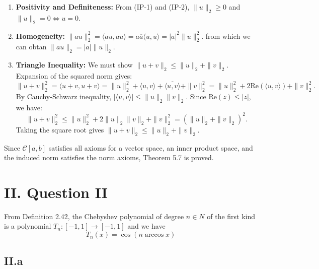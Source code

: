 \documentclass[a4paper]{article}
\begin{document}
\begin{enumerate}
    \item \textbf{Positivity and Definiteness:}
    From (IP-1) and (IP-2), $\|u\|_2 \geq 0$ and $\|u\|_2 = 0 \iff u = {0}$.

    \item \textbf{Homogeneity:}
    $\|au\|_2^2 = \langle au, au \rangle = a \overline{a} \langle u, u \rangle = |a|^2 \|u\|_2^2$.
    from which we can obtan $\|au\|_2 = |a| \|u\|_2$.

    \item \textbf{Triangle Inequality:}
    We must show $\|u+v\|_2 \leq \|u\|_2 + \|v\|_2$.
    Expansion of the squared norm gives:
    \[
    \|u+v\|_2^2 = \langle u+v, u+v \rangle = \|u\|_2^2 + \langle u, v \rangle + \overline{\langle u, v \rangle} + \|v\|_2^2 = \|u\|_2^2 + 2\text{Re}(\langle u, v \rangle) + \|v\|_2^2.
    \]
    By Cauchy-Schwarz inequality, $|\langle u, v \rangle| \leq \|u\|_2 \|v\|_2$.
    Since $\text{Re}(z) \leq |z|$, we have:
    \[
    \|u+v\|_2^2 \leq \|u\|_2^2 + 2\|u\|_2 \|v\|_2 + \|v\|_2^2 = (\|u\|_2 + \|v\|_2)^2.
    \]
    Taking the square root gives $\|u+v\|_2 \leq \|u\|_2 + \|v\|_2$.
\end{enumerate}
Since $\mathcal{C}[a,b]$ satisfies all axioms for a vector space, an inner product space, and the induced norm satisfies the norm axioms, Theorem 5.7 is proved. 


\section*{II. Question II}

From Definition 2.42, the Chebyshev polynomial of degree $n\in N$ of the first kind is a polynomial $T_n: [-1,1]\to[-1,1]$ and we have 
\begin{equation}
  T_n(x)=\cos(n\arccos x)
\end{equation}

\subsection*{II.a}
\end{document}
